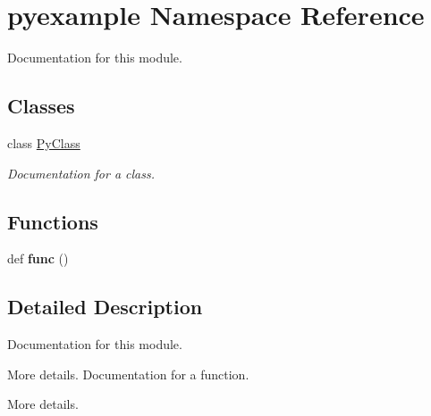 \hypertarget{namespacepyexample}{}\section{pyexample Namespace Reference}
\label{namespacepyexample}


Documentation for this module.  


\subsection*{Classes}
\begin{DoxyCompactItemize}
\item 
class \hyperlink{classpyexample_1_1PyClass}{Py\+Class}
\begin{DoxyCompactList}\small\item\em Documentation for a class. \end{DoxyCompactList}\end{DoxyCompactItemize}
\subsection*{Functions}
\begin{DoxyCompactItemize}
\item 
\mbox{\label{namespacepyexample_a2daf35288bc9d0a1d4233ab18b553451}} 
def {\bfseries func} ()
\end{DoxyCompactItemize}


\subsection{Detailed Description}
Documentation for this module. 

More details. Documentation for a function.

More details. 
